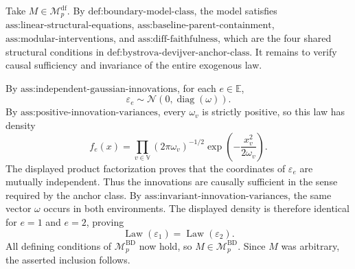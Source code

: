 Take \(M\in\mathcal M_p^{\mathrm{df}}\).  By \(\text{def:boundary-model-class}\), the model satisfies \(\text{ass:linear-structural-equations}\), \(\text{ass:baseline-parent-containment}\), \(\text{ass:modular-interventions}\), and \(\text{ass:diff-faithfulness}\), which are the four shared structural conditions in \(\text{def:bystrova-devijver-anchor-class}\).  It remains to verify causal sufficiency and invariance of the entire exogenous law.

By \(\text{ass:independent-gaussian-innovations}\), for each \(e\in\mathbb E\),
\[
 \varepsilon_e\sim\mathcal N(0,\operatorname{diag}(\omega)).
\]
By \(\text{ass:positive-innovation-variances}\), every \(\omega_v\) is strictly positive, so this law has density
\[
 f_e(x)=\prod_{v\in\mathbb V}
 (2\pi\omega_v)^{-1/2}
 \exp\!\left(-\frac{x_v^2}{2\omega_v}\right).
\]
The displayed product factorization proves that the coordinates of \(\varepsilon_e\) are mutually independent.  Thus the innovations are causally sufficient in the sense required by the anchor class.  By \(\text{ass:invariant-innovation-variances}\), the same vector \(\omega\) occurs in both environments.  The displayed density is therefore identical for \(e=1\) and \(e=2\), proving
\[
 \operatorname{Law}(\varepsilon_1)=\operatorname{Law}(\varepsilon_2).
\]
All defining conditions of \(\mathcal M_p^{\mathrm{BD}}\) now hold, so \(M\in\mathcal M_p^{\mathrm{BD}}\).  Since \(M\) was arbitrary, the asserted inclusion follows.